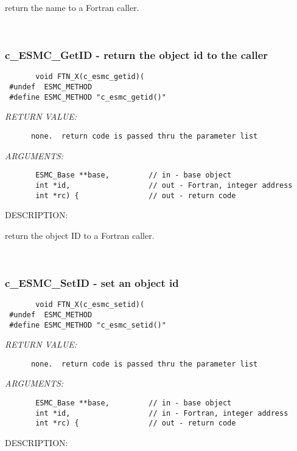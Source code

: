        return the name to a Fortran caller.
   
 
\mbox{}\hrulefill\
 
\subsubsection [c\_ESMC\_GetID] {c\_ESMC\_GetID - return the object id to the caller}


  
\begin{verbatim}       void FTN_X(c_esmc_getid)(
 #undef  ESMC_METHOD
 #define ESMC_METHOD "c_esmc_getid()"\end{verbatim}{\em RETURN VALUE:}
\begin{verbatim}      none.  return code is passed thru the parameter list
   \end{verbatim}{\em ARGUMENTS:}
\begin{verbatim}       ESMC_Base **base,         // in - base object
       int *id,                  // out - Fortran, integer address
       int *rc) {                // out - return code
   \end{verbatim}
{\sf DESCRIPTION:\\ }


       return the object ID to a Fortran caller.
   
 
\mbox{}\hrulefill\
 
\subsubsection [c\_ESMC\_SetID] {c\_ESMC\_SetID - set an object id }


  
\begin{verbatim}       void FTN_X(c_esmc_setid)(
 #undef  ESMC_METHOD
 #define ESMC_METHOD "c_esmc_setid()"\end{verbatim}{\em RETURN VALUE:}
\begin{verbatim}      none.  return code is passed thru the parameter list
   \end{verbatim}{\em ARGUMENTS:}
\begin{verbatim}       ESMC_Base **base,         // in - base object
       int *id,                  // in - Fortran, integer address
       int *rc) {                // out - return code
   \end{verbatim}
{\sf DESCRIPTION:\\ }



